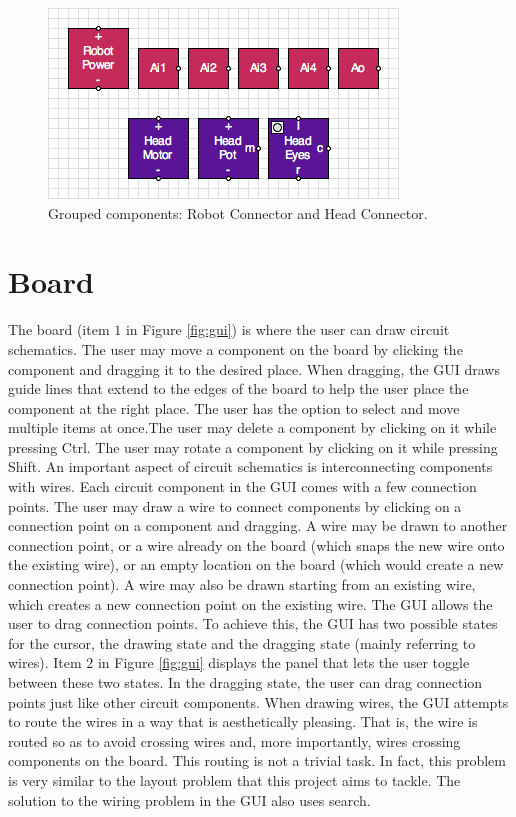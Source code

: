 \begin{figure}
\begin{center}
\includegraphics[scale=0.75]{Images/robot_head_parts.png}
\caption{Grouped components: Robot Connector and Head Connector.}
\label{fig:robot_head_parts}
\end{center}
\end{figure}

\section{Board}
\label{sec:board}

The board (item $1$ in Figure \ref{fig:gui}) is where the user can draw circuit
schematics. The user may move a component on the board by clicking the component
and dragging it to the desired place. When dragging, the GUI draws guide lines
that extend to the edges of the board to help the user place the component
at the right place. The user has the option to select and move multiple items at
once.The user may delete a component by clicking on it while
pressing Ctrl. The user may rotate a component by clicking on it
while pressing Shift. An important aspect of circuit schematics is
interconnecting components with wires. Each circuit component in the GUI comes
with a few connection points. The user may draw a wire to connect
components by clicking on a connection point on a component and dragging.
A wire may be drawn to another connection
point, or a wire already on the board (which snaps the new wire onto the
existing wire), or an empty location on the board (which would create a new
connection point). A wire may also be drawn starting from an existing wire,
which creates a new connection point on the existing wire. The GUI allows the
user to drag connection points. To achieve this, the GUI has two possible
states for the cursor, the drawing state and the dragging state (mainly
referring to wires). Item $2$ in Figure \ref{fig:gui} displays the panel that
lets the user toggle between these two states. In the dragging state, the user
can drag connection points just like other circuit components.
When drawing wires,
the GUI attempts to route the wires in a way that is aesthetically pleasing.
That is, the wire is routed so as to avoid crossing wires and, more importantly,
wires crossing components on the board. This routing is not a trivial
task. In fact, this problem is very similar to the layout problem that this
project aims to tackle. The solution to the wiring problem in the GUI also uses
search.

